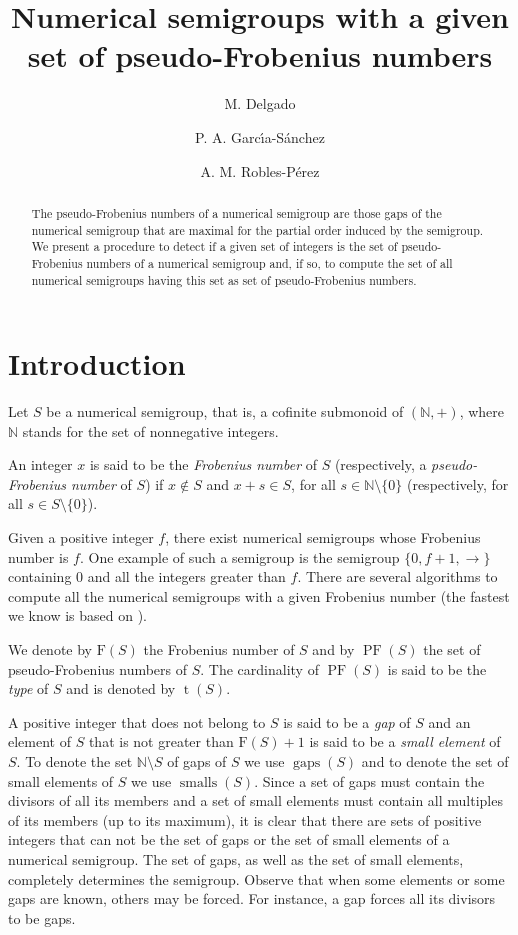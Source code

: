 \documentclass[11pt]{amsart}
\title[Algorithm for pseudo-Frobenius]
{Numerical semigroups with a given set of pseudo-Frobenius numbers}
\author{M. Delgado}
\author{P. A. Garc\'{\i}a-S\'{a}nchez}
\author{A. M. Robles-P\'erez}
\theoremstyle{remark}
\begin{document}
\begin{abstract}
The pseudo-Frobenius numbers of a numerical semigroup are those gaps of the numerical semigroup that are maximal for the partial order induced by the semigroup.
We present a procedure to detect if a given set of integers is the set of pseudo-Frobenius numbers of a numerical semigroup and, if so, to compute the set of all numerical semigroups having this set as set of pseudo-Frobenius numbers.
\end{abstract}
\maketitle
\section{Introduction}
\label{sec:introduction}
Let $S$ be a numerical semigroup, that is, a cofinite submonoid of $(\mathbb N,+)$, where $\mathbb N$ stands for the set of nonnegative integers.

An integer $x$ is said to be the \emph{Frobenius number} of $S$ (respectively,
a \emph{pseudo-Frobenius number} of $S$) if $x\not\in S$ and $x+s\in S$, for all $s\in \mathbb{N}\setminus{\{0\}}$ (respectively, for all $s\in S\setminus{\{0\}}$).

Given a positive integer $f$, there exist numerical semigroups whose Frobenius number is $f$. One example of such a semigroup is the semigroup $\{0,f+1,\to\}$ containing $0$ and all the integers greater than $f$.
There are several algorithms to compute all the numerical semigroups with a given Frobenius number (the fastest we know is based on \cite{huecos-fun}).

We denote by $\mathrm{F}(S)$ the Frobenius number of $S$ and by $\operatorname{PF}(S)$ the set of pseudo-Frobenius numbers of $S$. The cardinality of $\operatorname{PF}(S)$ is said to be the \emph{type} of $S$ and is denoted by $\operatorname{t}(S)$.

A positive integer that does not belong to $S$ is said to be a \emph{gap} of $S$ and an element of $S$ that is not greater than $\mathrm{F}(S)+1$ is said to be a \emph{small element} of $S$. To denote the set $\mathbb{N}\setminus S$ of gaps of $S$ we use $\operatorname{gaps}(S)$ and to denote the set of small elements of $S$ we use $\operatorname{smalls}(S)$. Since a set of gaps must contain the divisors of all its members and a set of small elements must contain all multiples of its members (up to its maximum), it is clear that there are sets of positive integers that can not be the set of gaps or the set of small elements of a numerical semigroup. The set of gaps, as well as the set of small elements, completely determines the semigroup. Observe that when some elements or some gaps are known, others may be forced. For instance, a gap forces all its divisors to be gaps. 
\medskip
\end{document}
